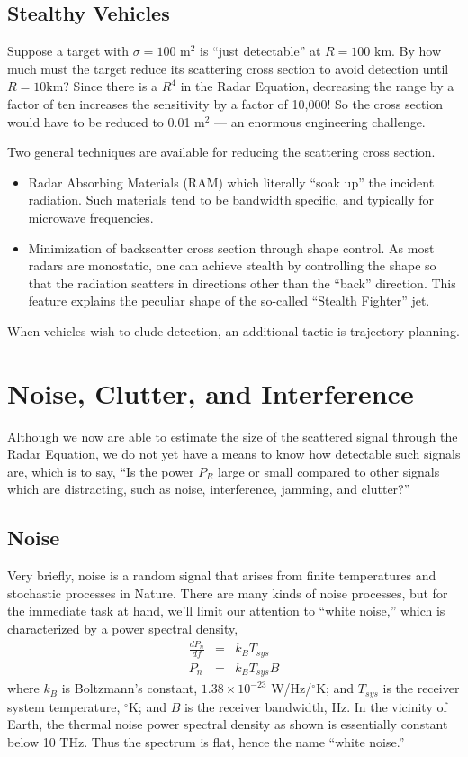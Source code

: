 \subsection{Stealthy Vehicles}

Suppose a target with $\sigma = 100$ m$^2$ is ``just detectable'' at
$R = 100$ km.  By how much must the target reduce its scattering cross
section to avoid detection until $R = 10 $km?  Since there is a $R^4$
in the Radar Equation, decreasing the range by a factor of ten
increases the sensitivity by a factor of 10,000!  So the cross section
would have to be reduced to 0.01 m$^2$ --- an enormous engineering
challenge.

Two general techniques are available for reducing the scattering cross
section.
\begin{itemize}
\item Radar Absorbing Materials (RAM) which literally ``soak up'' the
  incident radiation.  Such materials tend to be bandwidth specific,
  and typically for microwave frequencies.
\item Minimization of backscatter cross section through shape
  control.  As most radars are monostatic, one can achieve stealth by
  controlling the shape so that the radiation scatters in directions
  other than the ``back'' direction.  This feature explains the
  peculiar shape of the so-called ``Stealth Fighter'' jet.
\end{itemize}
When vehicles wish to elude detection, an additional tactic is trajectory planning.




\section{Noise, Clutter, and Interference}

Although we now are able to estimate the size of the scattered signal
through the Radar Equation, we do not yet have a means to know how
detectable such signals are, which is to say, ``Is the power $P_R$ large
or small compared to other signals which are distracting, such as
noise, interference, jamming, and clutter?''

\subsection{Noise}

Very briefly, noise is a random signal that arises from finite
temperatures and stochastic processes in Nature.  There are many kinds
of noise processes, but for the immediate task at hand, we'll limit
our attention to ``white noise,'' which is characterized by a power
spectral density,
\begin{eqnarray}
\frac{dP_n}{df} &=& k_B T_{sys} \\
P_n &=& k_B T_{sys} B
\end{eqnarray}
where $k_B$ is Boltzmann's constant, $1.38\times 10^{-23}$
W/Hz/$^\circ$K; and $T_{sys}$ is the receiver system temperature,
$^\circ$K; and $B$ is the receiver bandwidth, Hz.  In the vicinity of Earth, the thermal noise
power spectral density as shown is essentially constant below 10 THz.   Thus the
spectrum is flat, hence the name ``white noise.''  

